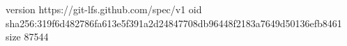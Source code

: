 version https://git-lfs.github.com/spec/v1
oid sha256:319f6d482786fa613e5f391a2d24847708db96448f2183a7649d50136efb8461
size 87544

